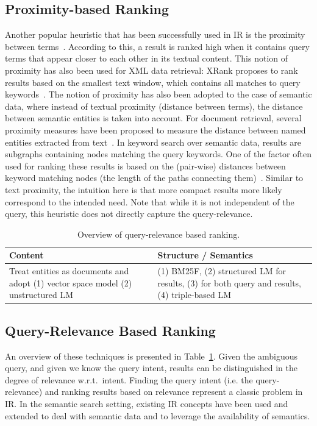 \subsection{Proximity-based Ranking} Another popular heuristic that has been successfully used in IR is the proximity between terms~\cite{DBLP:conf/sigir/TaoZ07}. According to this, a result is ranked high when it contains query terms that appear closer to each other in its textual content. This notion of proximity has also been used for XML data retrieval: XRank proposes to rank results based on the smallest text window, which contains all matches to query keywords~\cite{DBLP:conf/sigmod/GuoSBS03}. The notion of proximity has also been adopted to the case of semantic data, where instead of textual proximity (distance between terms), the distance between semantic entities is taken into account. For document retrieval, several proximity measures have been proposed to measure the distance between named entities extracted from text~\cite{DBLP:conf/iiwas/LeCHC11}. In keyword search over semantic data, results are subgraphs containing nodes matching the query keywords. One of the factor often used for ranking these results is based on the (pair-wise) distances between keyword matching nodes (the length of the paths connecting them)~\cite{DBLP:conf/cikm/LadwigT11,DBLP:conf/icde/TranWRC09,DBLP:conf/sigmod/LiJLF09}. Similar to text proximity, the intuition here is that more compact results more likely correspond to the intended need. Note that while it is not independent of the query, this heuristic does not directly capture the query-relevance. 

\begin{table}[htbp]
  \centering
  \caption{Overview of query-relevance based ranking.}
    \begin{tabular}{|p{3.2cm}|p{3.8cm}|}
    \hline
    \textbf{Content} & \textbf{Structure} / \textbf{Semantics}  \bigstrut\\
    \hline
    \hline
    Treat entities as documents and adopt (1) vector space model (2) unstructured LM & (1) BM25F, (2) structured LM for results, (3) for both query and results, (4) triple-based LM \bigstrut\\
    \hline
    \end{tabular}%
  \label{tab:queryrelevance}%
  \vspace{-0.5cm}
\end{table}%


\subsection{Query-Relevance Based Ranking} An overview of these techniques is presented in Table~\ref{tab:queryrelevance}. Given the ambiguous query, and given we know the query intent, results can be distinguished in the degree of relevance w.r.t.~intent. Finding the query intent (i.e. the query-relevance) and ranking results based on relevance represent a classic problem in IR. In the semantic search setting, existing IR concepts have been used and extended to deal with semantic data and to leverage the availability of semantics. 

